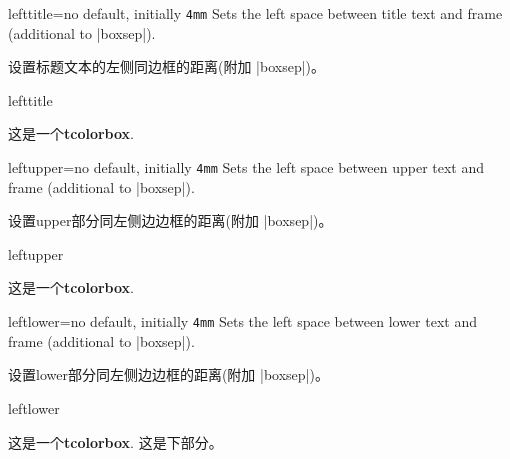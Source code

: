 




\begin{docTcbKey}{lefttitle}{=}{no default, initially \texttt{4mm}}
  Sets the left space between title text and frame (additional to |boxsep|).

设置标题文本的左侧同边框的距离(附加 |boxsep|)。
\begin{exdispExample}{lefttitle}

\begin{tcolorbox}[lefttitle=3cm,title=My Title]
这是一个\textbf{tcolorbox}.
\end{tcolorbox}
\end{exdispExample}
\end{docTcbKey}


\begin{docTcbKey}{leftupper}{=}{no default, initially \texttt{4mm}}
  Sets the left space between upper text and frame (additional to |boxsep|).

设置upper部分同左侧边边框的距离(附加 |boxsep|)。
\begin{exdispExample}{leftupper}

\begin{tcolorbox}[leftupper=3cm,title=My Title]
这是一个\textbf{tcolorbox}.
\end{tcolorbox}
\end{exdispExample}
\end{docTcbKey}

\begin{docTcbKey}{leftlower}{=}{no default, initially \texttt{4mm}}
  Sets the left space between lower text and frame (additional to |boxsep|).

设置lower部分同左侧边边框的距离(附加 |boxsep|)。
\begin{exdispExample}{leftlower}

\begin{tcolorbox}[leftlower=3cm]
这是一个\textbf{tcolorbox}.
\tcblower
这是下部分。
\end{tcolorbox}
\end{exdispExample}
\end{docTcbKey}

